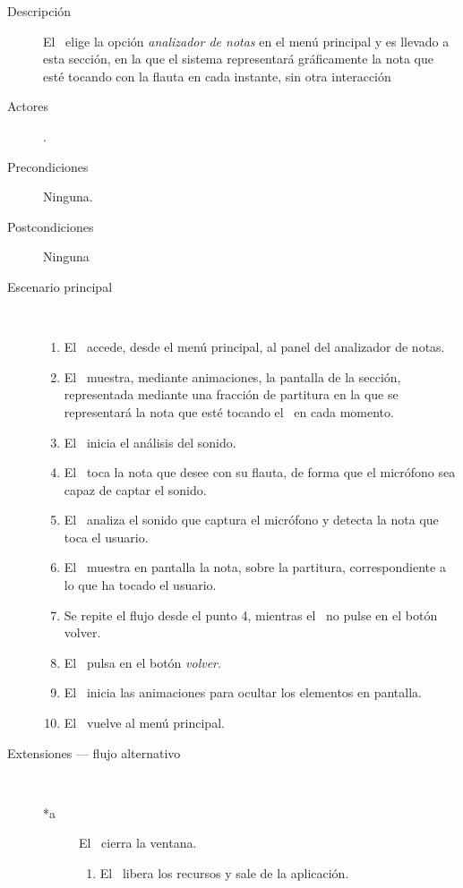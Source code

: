 \begin{description}
\item [Descripción] El \jugador\ elige la opción \textit{analizador de notas} en
  el menú principal y es llevado a esta sección, en la que el sistema
  representará gráficamente la nota que esté tocando con la flauta en cada
  instante, sin otra interacción
\item [Actores] \jugador.
\item [Precondiciones] Ninguna.
\item [Postcondiciones] Ninguna
\item [Escenario principal] $\quad$
  \begin{enumerate}
  \item El \jugador\ accede, desde el menú principal, al panel del analizador de notas.
  \item El \sistema\ muestra, mediante animaciones, la pantalla de la sección,
    representada mediante una fracción de partitura en la que se representará la
    nota que esté tocando el \jugador\ en cada momento.
  \item El \sistema\ inicia el análisis del sonido.
  \item El \jugador\ toca la nota que desee con su flauta, de forma que el
    micrófono sea capaz de captar el sonido.
  \item El \sistema\ analiza el sonido que captura el micrófono y detecta la
    nota que toca el usuario.
  \item El \sistema\ muestra en pantalla la nota, sobre la partitura,
    correspondiente a lo que ha tocado el usuario.
  \item Se repite el flujo desde el punto 4, mientras el \jugador\ no pulse en
    el botón volver.
  \item El \jugador\ pulsa en el botón \textit{volver}.
  \item El \sistema\ inicia las animaciones para ocultar los elementos en pantalla.
  \item El \sistema\ vuelve al menú principal.
  \end{enumerate}
\item[Extensiones --- flujo alternativo] $\quad$
  \begin{description}

  \item [*a] El \jugador\ cierra la ventana.
    \begin{enumerate}
    \item El \sistema\ libera los recursos y sale de la aplicación.
    \end{enumerate}


\end{description}
\end{description}
